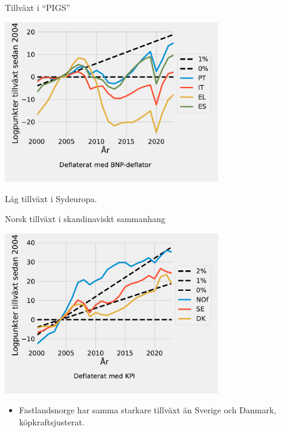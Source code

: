 \documentclass{beamer}
\begin{document}
\begin{frame}{Tillväxt i ``PIGS''}
    \label{pigs}
    \begin{center}
        \includegraphics[width=0.7\textwidth]{figures/GDP_growth0_PIGS.pdf}
    \end{center}
    \bigskip
    \footnotesize
    Låg tillväxt i Sydeuropa.
    \hyperlink{eu_growth}{}
\end{frame}

\begin{frame}{Norsk tillväxt i skandinaviskt sammanhang}
    \label{scandinavia_cpi}
    \begin{center}
        \includegraphics[width=0.7\textwidth]{figures/GDP_growth1_Scandinavia.pdf}
        \begin{itemize}
            \item Fastlandsnorge har samma starkare tillväxt än Sverige och Danmark, köpkraftsjusterat.
        \end{itemize}
    \end{center}

    \hyperlink{scandinavia_gdp}{}
\end{frame}
\end{document}

